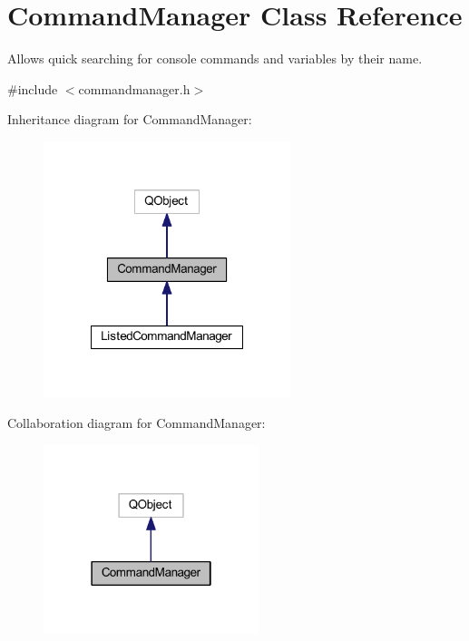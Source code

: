 \hypertarget{class_command_manager}{\section{Command\-Manager Class Reference}
\label{class_command_manager}
}


Allows quick searching for console commands and variables by their name.  




{\ttfamily \#include $<$commandmanager.\-h$>$}



Inheritance diagram for Command\-Manager\-:\nopagebreak
\begin{figure}[H]
\begin{center}
\leavevmode
\includegraphics[width=204pt]{class_command_manager__inherit__graph}
\end{center}
\end{figure}


Collaboration diagram for Command\-Manager\-:\nopagebreak
\begin{figure}[H]
\begin{center}
\leavevmode
\includegraphics[width=178pt]{class_command_manager__coll__graph}
\end{center}
\end{figure}
